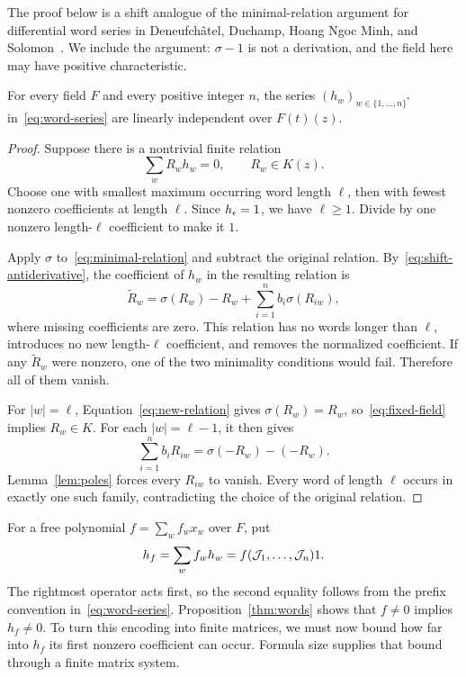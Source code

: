 The proof below is a shift analogue of the minimal-relation argument for
differential word series in Deneufch\^atel, Duchamp, Hoang Ngoc Minh, and
Solomon~\cite[Theorem~1]{Deneufchatel2011}. We include the argument:
$\sigma-1$ is not a derivation, and the field here may have positive
characteristic.

\begin{proposition}\label{thm:words}
For every field $F$ and every positive integer $n$, the series
$(h_w)_{w\in\{1,\ldots,n\}^*}$ in~\eqref{eq:word-series} are linearly
independent over $F(t)(z)$.
\end{proposition}

\begin{proof}
Suppose there is a nontrivial finite relation
\begin{equation}\label{eq:minimal-relation}
 \sum_w R_w h_w=0,\qquad R_w\in K(z).
\end{equation}
Choose one with smallest maximum occurring word length $\ell$, then with
fewest nonzero coefficients at length $\ell$. Since $h_\epsilon=1$, we have
$\ell\ge1$. Divide by one nonzero length-$\ell$ coefficient to make it $1$.

Apply $\sigma$ to~\eqref{eq:minimal-relation} and subtract the original
relation. By~\eqref{eq:shift-antiderivative}, the coefficient of $h_w$ in
the resulting relation is
\begin{equation}\label{eq:new-relation}
 \widetilde R_w=\sigma(R_w)-R_w+
          \sum_{i=1}^n b_i\sigma(R_{iw}),
\end{equation}
where missing coefficients are zero. This relation has no words longer
than $\ell$, introduces no new length-$\ell$ coefficient, and removes
the normalized coefficient. If any $\widetilde R_w$ were nonzero, one
of the two minimality conditions would fail. Therefore all of them vanish.

For $|w|=\ell$, Equation~\eqref{eq:new-relation} gives
$\sigma(R_w)=R_w$, so~\eqref{eq:fixed-field} implies $R_w\in K$.
For each $|w|=\ell-1$, it then gives
\[
 \sum_{i=1}^n b_i R_{iw}=\sigma(-R_w)-(-R_w).
\]
Lemma~\ref{lem:poles} forces every $R_{iw}$ to vanish. Every word of
length $\ell$ occurs in exactly one such family, contradicting the
choice of the original relation.
\end{proof}

For a free polynomial $f=\sum_w f_w x_w$ over $F$, put
\begin{equation}\label{eq:hf}
 h_f=\sum_w f_w h_w=f(\mathcal J_1,\ldots,\mathcal J_n)1.
\end{equation}
The rightmost operator acts first, so the second equality follows from
the prefix convention in~\eqref{eq:word-series}. Proposition~\ref{thm:words}
shows that $f\ne0$ implies $h_f\ne0$. To turn this encoding into finite
matrices, we must now bound how far into $h_f$ its first nonzero coefficient
can occur. Formula size supplies that bound through a finite matrix system.
